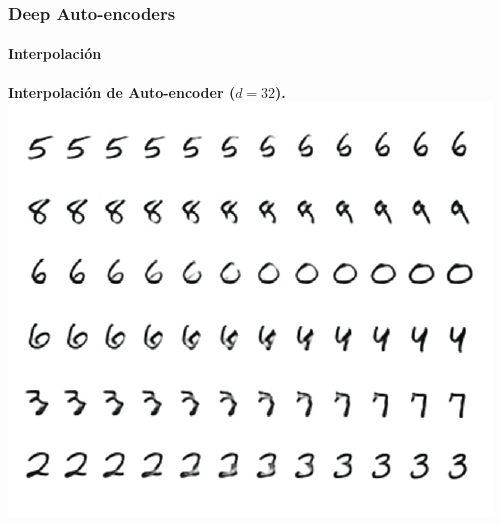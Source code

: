 \documentclass[aspectratio=169]{beamer}
\begin{document}
\begin{frame}[c]\frametitle{Deep Auto-encoders}\framesubtitle{Interpolación}
  \begin{center}
    \textbf{Interpolación de Auto-encoder ($d=32$).}\\
    \vspace{.2cm}
    \includegraphics[width=.45\textwidth, center]{imgs/tema4/aenc/aenc_interpol.pdf}\\    
  \end{center}
\end{frame}


\end{document}
